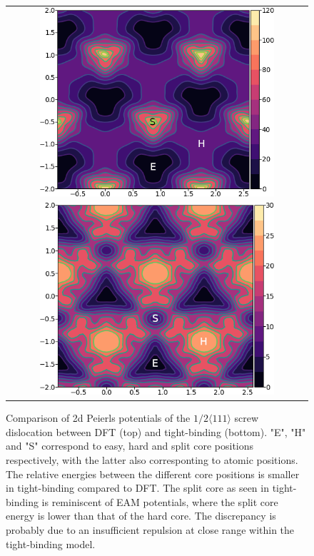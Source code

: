 \documentclass[a4paper,11pt]{article}
\begin{document}
        \begin{figure}
    \begin{tabular}{c}
	     \includegraphics[width=0.8\textwidth]{../Images/itakura_dislocation_energy_landscape_2_labelled.png} \\
             \includegraphics[width=0.8\textwidth]{../Images/tbe_dislocation_energy_landscape_pure_labelled.png}  \\
    \end{tabular}		
\caption{Comparison of 2d Peierls potentials of the $1/2\langle 111\rangle$ screw dislocation between DFT \cite{Itakura2012} (top) and tight-binding (bottom). "E", "H" and "S" correspond to easy, hard and split core positions respectively, with the latter also corresponting to atomic positions. The relative energies between the different core positions is smaller in tight-binding compared to DFT. The split core as seen in tight-binding is reminiscent of EAM potentials, where the split core energy is lower than that of the hard core. The discrepancy is probably due to an insufficient repulsion at close range within the tight-binding model.}
	\label{fig:peierlspot}
    \end{figure}
\end{document}
